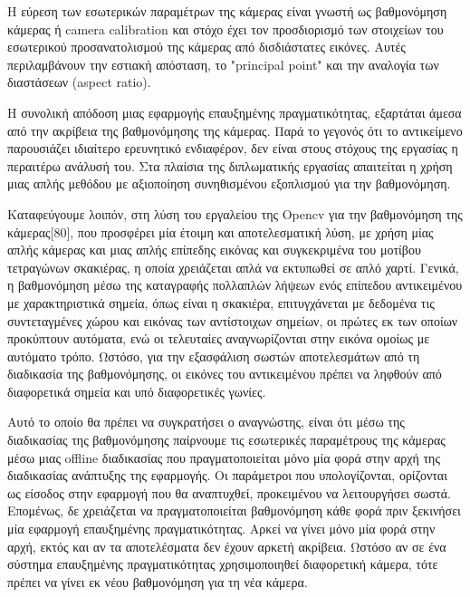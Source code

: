 Η εύρεση των εσωτερικών παραμέτρων της κάμερας είναι γνωστή ως βαθμονόμηση κάμερας ή camera calibration και στόχο έχει τον προσδιορισμό των στοιχείων του εσωτερικού προσανατολισμού της κάμερας από δισδιάστατες εικόνες. Αυτές περιλαμβάνουν την εστιακή απόσταση, το "principal point" και την αναλογία των διαστάσεων (aspect ratio). 

Η συνολική απόδοση μιας εφαρμογής επαυξημένης πραγματικότητας, εξαρτάται άμεσα από την ακρίβεια της βαθμονόμησης της κάμερας. Παρά το γεγονός ότι το αντικείμενο παρουσιάζει ιδιαίτερο ερευνητικό ενδιαφέρον, δεν είναι στους στόχους της εργασίας η περαιτέρω ανάλυσή του. Στα πλαίσια της διπλωματικής εργασίας απαιτείται η χρήση μιας απλής μεθόδου με αξιοποίηση συνηθισμένου εξοπλισμού για την βαθμονόμηση. 


Καταφεύγουμε λοιπόν, στη λύση του εργαλείου της Opencv για την βαθμονόμηση της κάμερας[80], που προσφέρει μία έτοιμη και αποτελεσματική λύση, με χρήση μίας απλής κάμερας και μιας απλής επίπεδης εικόνας και συγκεκριμένα του μοτίβου τετραγώνων σκακιέρας, η οποία χρειάζεται απλά να εκτυπωθεί σε απλό χαρτί. 
Γενικά, η βαθμονόμηση μέσω της καταγραφής πολλαπλών λήψεων ενός επίπεδου αντικειμένου με χαρακτηριστικά σημεία, όπως είναι η σκακιέρα, επιτυγχάνεται με δεδομένα τις συντεταγμένες χώρου και εικόνας των αντίστοιχων σημείων, οι πρώτες εκ των οποίων προκύπτουν αυτόματα, ενώ οι τελευταίες αναγνωρίζονται στην εικόνα ομοίως με αυτόματο τρόπο. Ωστόσο, για την εξασφάλιση σωστών αποτελεσμάτων από τη διαδικασία της βαθμονόμησης, οι εικόνες του αντικειμένου πρέπει να ληφθούν από διαφορετικά σημεία και υπό διαφορετικές γωνίες. 




Αυτό το οποίο θα πρέπει να συγκρατήσει ο αναγνώστης, είναι ότι μέσω της διαδικασίας της βαθμονόμησης παίρνουμε τις εσωτερικές παραμέτρους της κάμερας μέσω μιας offline διαδικασίας που πραγματοποιείται μόνο μία φορά στην αρχή της διαδικασίας ανάπτυξης της εφαρμογής. Οι παράμετροι που υπολογίζονται, ορίζονται ως είσοδος στην εφαρμογή που θα αναπτυχθεί, προκειμένου να λειτουργήσει σωστά. Επομένως, δε χρειάζεται να πραγματοποιείται βαθμονόμηση κάθε φορά πριν ξεκινήσει μία εφαρμογή επαυξημένης πραγματικότητας. Αρκεί να γίνει μόνο μία φορά στην αρχή, εκτός και αν τα αποτελέσματα δεν έχουν αρκετή ακρίβεια. Ωστόσο αν σε ένα σύστημα επαυξημένης πραγματικότητας χρησιμοποιηθεί διαφορετική κάμερα, τότε πρέπει να γίνει εκ νέου βαθμονόμηση για τη νέα κάμερα.







